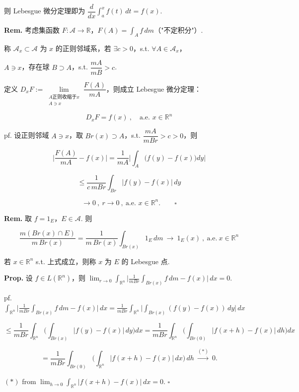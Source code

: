 \documentclass[11pt]{ctexart}
\theoremstyle{definition}
\begin{document}
则 Lebesgue 微分定理即为 $\dfrac{d}{dx} \displaystyle\int_a^x f(t)\, dt = f(x)$.

\textbf{Rem.} 考虑集函数 $F: \mathscr{A} \to \mathbb{R}$，$F(A) = \displaystyle\int_A f \, dm$（"不定积分"）.

称 $\mathscr{A}_x \subset \mathscr{A}$ 为 $x$ 的正则邻域系，若 $\exists c > 0$，s.t. $\forall A \in \mathscr{A}_x$，

$A \ni x$，存在球 $B \supset A$，s.t. $\dfrac{mA}{mB} > c$.

定义 $D_x F := \lim\limits_{\substack{A \text{正则收缩于} x \\ A \ni x}} \dfrac{F(A)}{mA}$，则成立 Lebesgue 微分定理：

\[
D_x F = f(x) \ ,\quad \text{a.e. } x \in \mathbb{R}^n
\]

pf. 设正则邻域 $A \ni x$，取 $Br(x) \supset A$，s.t. $\dfrac{mA}{mBr} > c > 0$，则

\[
\Big\vert \dfrac{F(A)}{mA} - f(x)\Big\vert = \dfrac{1}{mA} \Big\vert \int_A \big(f(y) - f(x)\big) dy\Big\vert
\]

\[
\leq \dfrac{1}{c\, mBr} \int_{Br} \vert f(y) - f(x)\vert \, dy
\]

\[
\to 0 \ ,\ r \to 0 \ ,\ \text{a.e. } x \in \mathbb{R}^n. \qquad \square
\]

\textbf{Rem.} 取 $f = 1_E$，$E \in \mathscr{A}$. 则

\[
\frac{m(Br(x) \cap E)}{m\, Br(x)} = \frac{1}{m\, Br(x)} \int_{Br(x)} 1_E \, dm \ \to\ 1_E(x) \ ,\ \text{a.e.}\ x \in \mathbb{R}^n
\]

若 $x \in \mathbb{R}^n$ s.t. 上式成立，则称 $x$ 为 $E$ 的 Lebesgue 点.

\textbf{Prop.} 设 $f \in L(\mathbb{R}^n)$，则 $\displaystyle\lim_{r \to 0} \int_{\mathbb{R}^n} \Big\vert \frac{1}{mBr} \int_{Br(x)} f \, dm - f(x)\Big\vert \, dx = 0$.

pf. $\displaystyle\int_{\mathbb{R}^n} \Big\vert \frac{1}{mBr} \int_{Br(x)} f \, dm - f(x)\Big\vert \, dx = \frac{1}{mBr} \int_{\mathbb{R}^n} \Big\vert \int_{Br(x)} (f(y) - f(x))\, dy\Big\vert \, dx$

\[
\leq \frac{1}{mBr} \int_{\mathbb{R}^n} \Big( \int_{Br(x)} \vert f(y) - f(x)\vert \, dy \Big) dx = \frac{1}{mBr} \int_{\mathbb{R}^n} \Big( \int_{Br(0)} \vert f(x+h) - f(x)\vert \, dh \Big) dx
\]

\[
= \frac{1}{mBr} \int_{Br(0)} \Big( \int_{\mathbb{R}^n} \vert f(x+h) - f(x)\vert \, dx \Big) \, dh \ \xrightarrow{(\ast)}\ 0.
\]

$(\ast)$ from $\displaystyle\lim_{h \to 0} \int_{\mathbb{R}^n} \vert f(x+h) - f(x)\vert \, dx = 0$. $\square$
\end{document}
